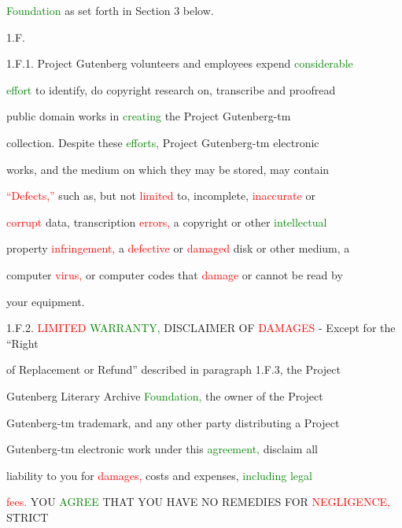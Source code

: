  \textcolor{green}{Foundation} as set forth in Section 3 below.



 1.F.



 1.F.1. Project Gutenberg \textcolor{BurntOrange}{volunteers} and employees expend \textcolor{green}{considerable}

 \textcolor{green}{effort} to identify, do copyright research on, transcribe and proofread

 \textcolor{BurntOrange}{public} domain works in \textcolor{green}{creating} the Project Gutenberg-tm

 collection. Despite these \textcolor{green}{efforts,} Project Gutenberg-tm electronic

 works, and the medium on which they may be \textcolor{BurntOrange}{stored,} may contain

 \textcolor{red}{“Defects,”} such as, but not \textcolor{red}{limited} to, incomplete, \textcolor{red}{inaccurate} or

 \textcolor{red}{corrupt} data, transcription \textcolor{red}{errors,} a copyright or other \textcolor{green}{intellectual}

 property \textcolor{red}{infringement,} a \textcolor{red}{defective} or \textcolor{red}{damaged} disk or other medium, a

 computer \textcolor{red}{virus,} or computer codes that \textcolor{red}{damage} or cannot be read by

 your equipment.



 1.F.2. \textcolor{red}{LIMITED} \textcolor{green}{WARRANTY,} DISCLAIMER OF \textcolor{red}{DAMAGES} - Except for the “Right

 of Replacement or Refund” described in paragraph 1.F.3, the Project

 Gutenberg Literary Archive \textcolor{green}{Foundation,} the owner of the Project

 Gutenberg-tm trademark, and any other party distributing a Project

 Gutenberg-tm electronic work under this \textcolor{green}{agreement,} \textcolor{BurntOrange}{disclaim} all

 liability to you for \textcolor{red}{damages,} costs and expenses, \textcolor{green}{including} \textcolor{green}{legal}

 \textcolor{red}{fees.} YOU \textcolor{green}{AGREE} THAT YOU HAVE NO \textcolor{BurntOrange}{REMEDIES} FOR \textcolor{red}{NEGLIGENCE,} STRICT

